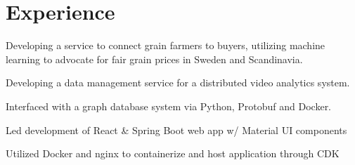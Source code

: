 \documentclass[letterpaper]{deedy-resume} %
\begin{document}
\begin{minipage}[t]{0.66\textwidth} %

\section{Experience}

Developing a service to connect grain farmers to buyers,
utilizing machine learning to advocate for fair grain prices in Sweden and Scandinavia.

\sectionspace %

\vspace{\topsep} %
\begin{tightitemize}
  \item Developing a data management service for a distributed video analytics system.
  \item Interfaced with a graph database system via Python, Protobuf and Docker.
\end{tightitemize}

\sectionspace %

\begin{tightitemize}
  \item Led development of React \& Spring Boot web app w/ Material UI components
  \item Utilized Docker and nginx to containerize and host application through CDK
\end{tightitemize}

\sectionspace %


\end{minipage}
\end{document}
